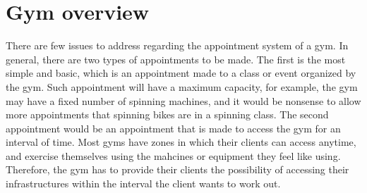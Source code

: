 \documentclass[a4paper, 12pt, oneside]{book}
\begin{document}
\section{Gym overview}
There are few issues to address regarding the appointment system of a gym. In general, there are two types of appointments to be made. The first is the most simple and basic, which is an appointment made to a class or event organized by the gym. Such appointment will have a maximum capacity, for example, the gym may have a fixed number of spinning machines, and it would be nonsense to allow more appointments that spinning bikes are in a spinning class. The second appointment would be an appointment that is made to access the gym for an interval of time. Most gyms have zones in which their clients can access anytime, and exercise themselves using the mahcines or equipment they feel like using. Therefore, the gym has to provide their clients the possibility of accessing their infrastructures within the interval the client wants to work out.
\end{document}
